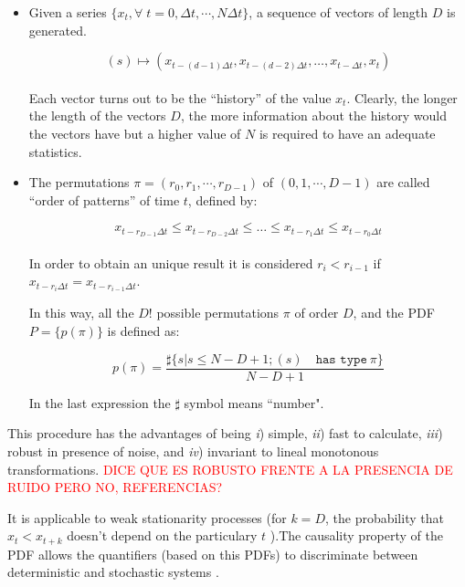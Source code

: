 \begin{itemize}
\item Given a series $\{x_t, \forall \;  t=0, \Delta t, \cdots,N\Delta t \}$, a sequence of vectors of length $D$ is generated.

\begin{equation}
(s)\longmapsto\left(x_{t-(d-1)\Delta t},x_{t-(d-2)\Delta t},\dots,x_{t-\Delta t},x_{t}\right) 
\label{eq:vectores}
\end{equation}
\\
Each vector turns out to be the ``history'' of the value $x_t$. Clearly, the longer the length of the vectors $D$, the more information about the history would the vectors have but a higher value of $N$ is required to have an adequate statistics. 
\\
\item The permutations $\pi=(r_0, r_1, \cdots, r_{D-1})$ of $(0, 1, \cdots, D-1)$ are called ``order of patterns'' of time $t$, defined by:

\begin{equation}
\label{eq:permuta}
x_{t-r_{D-1}\Delta t}\le x_{t-r_{D-2}\Delta t}\le\dots\le x_{t-r_{1}\Delta t}\le x_{t-r_0\Delta t}
\end{equation}
\\
In order to obtain an unique result it is considered $r_i<r_{i-1}$ if $x_{t-r_{i}\Delta t}=x_{t-r_{i-1}\Delta t}$.

In this way, all the $D!$ possible permutations $\pi$ of order $D$, and the PDF $P=\{p(\pi)\}$ is defined as:

\begin{equation}
\label{eq:frequ}
p(\pi)=\frac{\sharp \{s|s\leq N-D+1; (s) \quad \texttt{has type}~\pi\}}{N-D+1}
\end{equation}

In the last expression the $\sharp$ symbol means ``number".
\end{itemize}

This procedure has the advantages of being {\it i}) simple, {\it ii}) fast to calculate, {\it iii}) robust in presence of noise, and {\it iv}) invariant to lineal monotonous transformations. \textcolor{red}{DICE QUE ES ROBUSTO FRENTE A LA PRESENCIA DE RUIDO PERO NO, REFERENCIAS?}

It is applicable to weak stationarity processes (for $k=D$, the probability that $x_t < x_{t+k}$ doesn't depend on the particulary $t$ \cite{Bandt2002}).The causality property of the PDF allows the quantifiers (based on this PDFs) to discriminate between deterministic and stochastic systems \cite{Rosso2007B}.

